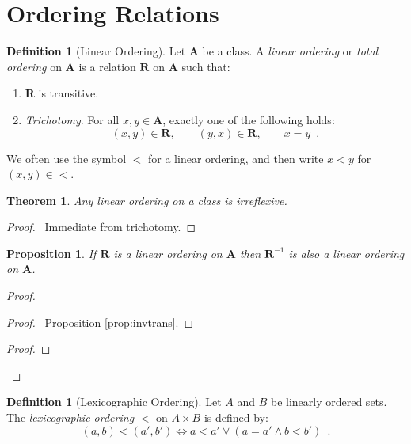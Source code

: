 \documentclass{book}
\let\qed\relax
\newtheorem{prop}[ax]{Proposition}
\newtheorem{thm}[ax]{Theorem}
\theoremstyle{definition}
\newtheorem{df}[ax]{Definition}
\begin{document}
\section{Ordering Relations}

\begin{df}[Linear Ordering]
Let $\mathbf{A}$ be a class. A \emph{linear ordering} or \emph{total ordering} on $\mathbf{A}$ is a relation $\mathbf{R}$ on $\mathbf{A}$ such that:
\begin{enumerate}
\item $\mathbf{R}$ is transitive.
\item \emph{Trichotomy}. For all $x,y \in \mathbf{A}$, exactly one of the following holds:
\[ (x,y) \in \mathbf{R}, \qquad (y,x) \in \mathbf{R}, \qquad x = y \enspace . \]
\end{enumerate}

We often use the symbol $<$ for a linear ordering, and then write $x < y$ for $(x,y) \in <$.
\end{df}

\begin{thm}
Any linear ordering on a class is irreflexive.
\end{thm}

\begin{proof}
\pf\ Immediate from trichotomy. \qed
\end{proof}

\begin{prop}
If $\mathbf{R}$ is a linear ordering on $\mathbf{A}$ then $\mathbf{R}^{-1}$ is also a linear ordering on $\mathbf{A}$.
\end{prop}

\begin{proof}
\pf
{}
\begin{proof}
	\pf\ Proposition \ref{prop:invtrans}.
\end{proof}
\begin{proof}
\end{proof}
\qed
\end{proof}

\begin{df}[Lexicographic Ordering]
Let $A$ and $B$ be linearly ordered sets. The \emph{lexicographic ordering} $<$ on $A \times B$ is defined by:
\[ (a,b) < (a',b') \Leftrightarrow a < a' \vee (a = a' \wedge b < b') \enspace . \]
\end{df}
\end{document}
